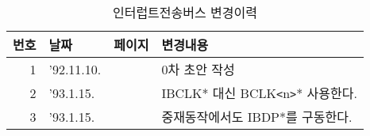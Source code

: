 %
\begin{table}[htbp]
\caption{인터럽트전송버스 변경이력}\label{table:ib}
  \begin{center}
  \begin{tabular}{|r|l|l|l|} \hline
      번호 & 날짜 & 페이지 & 변경내용 \\ \hline \hline
      1  & '92.11.10. & & 0차 초안 작성 \\ \hline
      2  & '93.1.15. & & IBCLK* 대신 BCLK{\tt <}n{\tt >}* 사용한다. \\ \hline
      3  & '93.1.15. & & 중재동작에서도 IBDP*를 구동한다.\\ \hline
  \end{tabular}
  \end{center}
\end{table}
%
